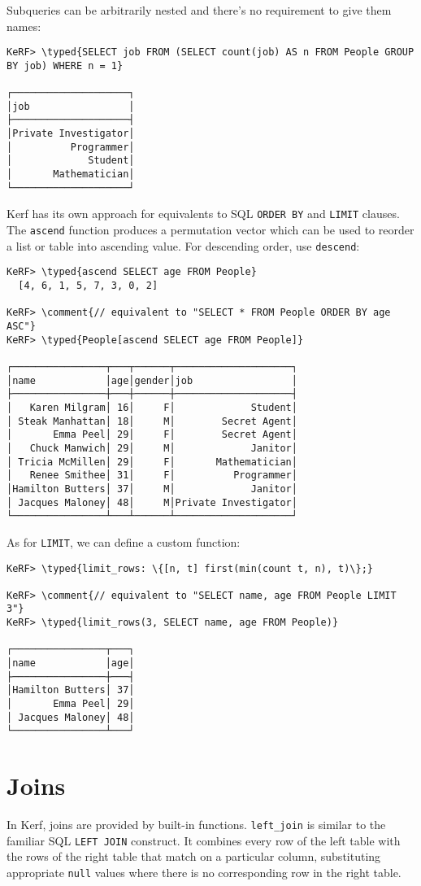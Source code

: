 \documentclass{article}
\newcommand{\typed}[1]{\textcolor{TealBlue}{#1}}
\newcommand{\comment}[1]{\textcolor{Orange}{#1}}
\begin{document}
Subqueries can be arbitrarily nested and there's no requirement to give them names:
\begin{Verbatim}
KeRF> \typed{SELECT job FROM (SELECT count(job) AS n FROM People GROUP BY job) WHERE n = 1}

┌────────────────────┐
│job                 │
├────────────────────┤
│Private Investigator│
│          Programmer│
│             Student│
│       Mathematician│
└────────────────────┘
\end{Verbatim}

Kerf has its own approach for equivalents to SQL \texttt{ORDER BY} and \texttt{LIMIT} clauses. The \texttt{ascend} function produces a permutation vector which can be used to reorder a list or table into ascending value. For descending order, use \texttt{descend}:

\begin{Verbatim}
KeRF> \typed{ascend SELECT age FROM People}
  [4, 6, 1, 5, 7, 3, 0, 2]

KeRF> \comment{// equivalent to "SELECT * FROM People ORDER BY age ASC"}
KeRF> \typed{People[ascend SELECT age FROM People]}

┌────────────────┬───┬──────┬────────────────────┐
│name            │age│gender│job                 │
├────────────────┼───┼──────┼────────────────────┤
│   Karen Milgram│ 16│     F│             Student│
│ Steak Manhattan│ 18│     M│        Secret Agent│
│       Emma Peel│ 29│     F│        Secret Agent│
│   Chuck Manwich│ 29│     M│             Janitor│
│ Tricia McMillen│ 29│     F│       Mathematician│
│   Renee Smithee│ 31│     F│          Programmer│
│Hamilton Butters│ 37│     M│             Janitor│
│ Jacques Maloney│ 48│     M│Private Investigator│
└────────────────┴───┴──────┴────────────────────┘
\end{Verbatim}

As for \texttt{LIMIT}, we can define a custom function:
\begin{Verbatim}
KeRF> \typed{limit_rows: \{[n, t] first(min(count t, n), t)\};}
  
KeRF> \comment{// equivalent to "SELECT name, age FROM People LIMIT 3"}
KeRF> \typed{limit_rows(3, SELECT name, age FROM People)}

┌────────────────┬───┐
│name            │age│
├────────────────┼───┤
│Hamilton Butters│ 37│
│       Emma Peel│ 29│
│ Jacques Maloney│ 48│
└────────────────┴───┘
\end{Verbatim}

\pagebreak
\section{Joins}
In Kerf, joins are provided by built-in functions. \texttt{left\_join} is similar to the familiar SQL \texttt{LEFT JOIN} construct. It combines every row of the left table with the rows of the right table that match on a particular column, substituting appropriate \texttt{null} values where there is no corresponding row in the right table.
\end{document}
